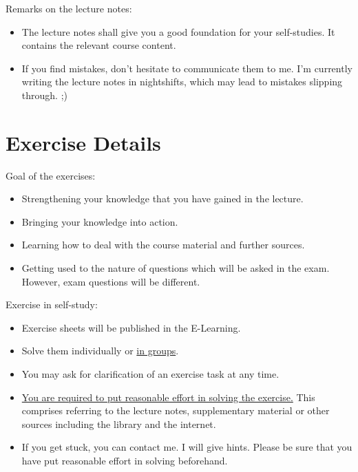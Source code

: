Remarks on the lecture notes:
\begin{itemize}
	\item The lecture notes shall give you a good foundation for your self-studies. It contains the relevant course content.
	\item If you find mistakes, don't hesitate to communicate them to me. I'm currently writing the lecture notes in nightshifts, which may lead to mistakes slipping through. ;)
\end{itemize}


\section{Exercise Details}

Goal of the exercises:
\begin{itemize}
	\item Strengthening your knowledge that you have gained in the lecture.
	\item Bringing your knowledge into action.
	\item Learning how to deal with the course material and further sources.
	\item Getting used to the nature of questions which will be asked in the exam. However, exam questions will be different.
\end{itemize}

Exercise in self-study:
\begin{itemize}
	\item Exercise sheets will be published in the E-Learning.
	\item Solve them individually or \underline{in groups}.
	\item You may ask for clarification of an exercise task at any time.
	\item \underline{You are required to put reasonable effort in solving the exercise.} This comprises referring to the lecture notes, supplementary material or other sources including the library and the internet.
	\item If you get stuck, you can contact me. I will give hints. Please be sure that you have put reasonable effort in solving beforehand.
\end{itemize}

